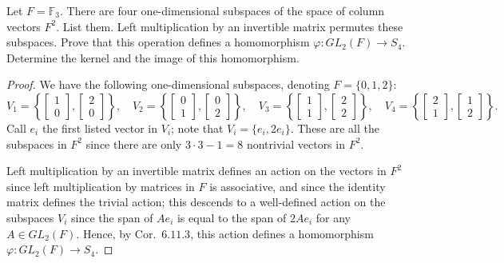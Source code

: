 \documentclass[12pt]{article}
\theoremstyle{remark}
\newcommand{\GL}{\mathit{GL}}
\begin{document}
\begin{problem}
  Let $F = \mathbb{F}_3$. There are four one-dimensional subspaces of the space of column vectors $F^2$. List them. Left multiplication by an invertible matrix permutes these subspaces. Prove that this operation defines a homomorphism $\varphi\colon \GL_2(F) \to S_4$. Determine the kernel and the image of this homomorphism.
\end{problem}
\begin{proof}
  We have the following one-dimensional subspaces, denoting $F = \{0,1,2\}$:
  \begin{equation*}
    V_1 = \left\{ \begin{bmatrix}1\\0\end{bmatrix},\begin{bmatrix}2\\0\end{bmatrix} \right\}, \quad
    V_2 = \left\{ \begin{bmatrix}0\\1\end{bmatrix},\begin{bmatrix}0\\2\end{bmatrix} \right\}, \quad
    V_3 = \left\{ \begin{bmatrix}1\\1\end{bmatrix},\begin{bmatrix}2\\2\end{bmatrix} \right\}, \quad
    V_4 = \left\{ \begin{bmatrix}2\\1\end{bmatrix},\begin{bmatrix}1\\2\end{bmatrix} \right\}.
  \end{equation*}
  Call $e_i$ the first listed vector in $V_i$; note that $V_i = \{e_i,2e_i\}$. These are all the subspaces in $F^2$ since there are only $3 \cdot 3 - 1 = 8$ nontrivial vectors in $F^2$.
  \par Left multiplication by an invertible matrix defines an action on the vectors in $F^2$ since left multiplication by matrices in $F$ is associative, and since the identity matrix defines the trivial action; this descends to a well-defined action on the subspaces $V_i$ since the span of $Ae_i$ is equal to the span of $2Ae_i$ for any $A \in \GL_2(F)$. Hence, by Cor.~$6.11.3$, this action defines a homomorphism $\varphi\colon \GL_2(F) \to S_4$.

\end{proof}
\end{document}
